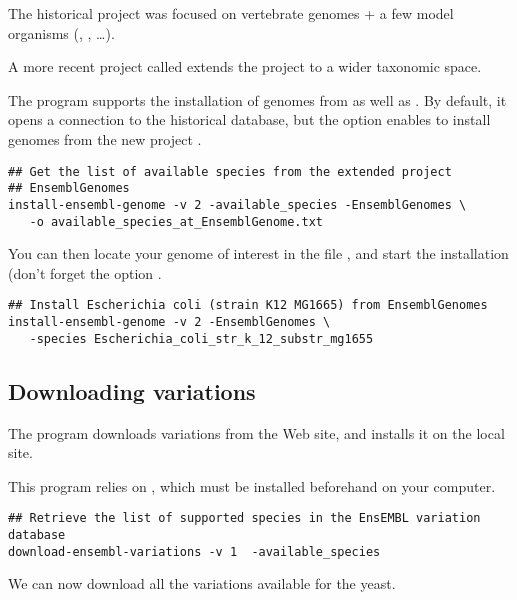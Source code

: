 The historical \ensembl project 
was focused on vertebrate genomes + a few model organisms
(, ,
\ldots).

A more recent project called \ensemblgenomes
{} extends the \ensembl project to a
wider taxonomic space.

The program  supports the installation
of genomes from \ensembl as well as \ensemblgenomes. By default, it
opens a connection to the historical \ensembl database, but the option
 enables to install genomes from the new
project \ensemblgenomes.

\begin{lstlisting}
## Get the list of available species from the extended project
## EnsemblGenomes
install-ensembl-genome -v 2 -available_species -EnsemblGenomes \
   -o available_species_at_EnsemblGenome.txt
\end{lstlisting}

You can then locate your genome of interest in the file
, and start the
installation (don't forget the option \option{-ensembl\_genomes}.

\begin{lstlisting}
## Install Escherichia coli (strain K12 MG1665) from EnsemblGenomes
install-ensembl-genome -v 2 -EnsemblGenomes \
   -species Escherichia_coli_str_k_12_substr_mg1655
\end{lstlisting}


\subsection{Downloading variations}

The program  downloads variations
from the \ensembl Web site, and installs it on the local \RSAT
site. 

This program relies on , which must be installed
beforehand on your computer.

\begin{lstlisting}
## Retrieve the list of supported species in the EnsEMBL variation database
download-ensembl-variations -v 1  -available_species
\end{lstlisting}

We can now download all the variations available for the yeast.

